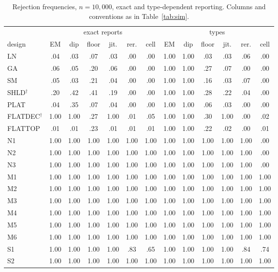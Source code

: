 \begin{table}[h]
\centering\footnotesize
\setlength{\tabcolsep}{4pt}
\caption{Rejection frequencies, $n=10{,}000$, exact and type-dependent reporting. Columns and conventions as in Table~\ref{tab:sim}.}\label{tab:S-sim10b}
\begin{tabular}{l*{6}{c}@{\hspace{10pt}}*{6}{c}}
\toprule
 & \multicolumn{6}{c}{exact reports} & \multicolumn{6}{c}{types}\\
\cmidrule(lr){2-7}\cmidrule(lr){8-13}
design & EM & dip & floor & jit. & rer. & cell & EM & dip & floor & jit. & rer. & cell\\
\midrule
LN & .04 & .03 & .07 & .03 & .00 & .00 & 1.00 & 1.00 & .03 & .03 & .06 & .00 \\
GA & .06 & .05 & .20 & .06 & .00 & .00 & 1.00 & 1.00 & .27 & .07 & .00 & .00 \\
SM & .05 & .03 & .21 & .04 & .00 & .00 & 1.00 & 1.00 & .16 & .03 & .07 & .00 \\
SHLD$^\dagger$ & .20 & .42 & .41 & .19 & .00 & .00 & 1.00 & 1.00 & .28 & .22 & .04 & .00 \\
PLAT & .04 & .35 & .07 & .04 & .00 & .00 & 1.00 & 1.00 & .06 & .03 & .00 & .00 \\
FLATDEC$^\dagger$ & 1.00 & 1.00 & .27 & 1.00 & .01 & .05 & 1.00 & 1.00 & .30 & 1.00 & .00 & .02 \\
FLATTOP & .01 & .01 & .23 & .01 & .01 & .01 & 1.00 & 1.00 & .22 & .02 & .00 & .01 \\
\midrule
N1 & 1.00 & 1.00 & 1.00 & 1.00 & 1.00 & 1.00 & 1.00 & 1.00 & 1.00 & 1.00 & 1.00 & .00 \\
N2 & 1.00 & 1.00 & 1.00 & 1.00 & 1.00 & 1.00 & 1.00 & 1.00 & 1.00 & 1.00 & 1.00 & .00 \\
N3 & 1.00 & 1.00 & 1.00 & 1.00 & 1.00 & 1.00 & 1.00 & 1.00 & 1.00 & 1.00 & 1.00 & .00 \\
M1 & 1.00 & 1.00 & 1.00 & 1.00 & 1.00 & 1.00 & 1.00 & 1.00 & 1.00 & 1.00 & 1.00 & 1.00 \\
M2 & 1.00 & 1.00 & 1.00 & 1.00 & 1.00 & 1.00 & 1.00 & 1.00 & 1.00 & 1.00 & 1.00 & 1.00 \\
M3 & 1.00 & 1.00 & 1.00 & 1.00 & 1.00 & 1.00 & 1.00 & 1.00 & 1.00 & 1.00 & 1.00 & 1.00 \\
M4 & 1.00 & 1.00 & 1.00 & 1.00 & 1.00 & 1.00 & 1.00 & 1.00 & 1.00 & 1.00 & 1.00 & 1.00 \\
M5 & 1.00 & 1.00 & 1.00 & 1.00 & 1.00 & 1.00 & 1.00 & 1.00 & 1.00 & 1.00 & 1.00 & 1.00 \\
M6 & 1.00 & 1.00 & 1.00 & 1.00 & 1.00 & 1.00 & 1.00 & 1.00 & 1.00 & 1.00 & 1.00 & 1.00 \\
S1 & 1.00 & 1.00 & 1.00 & 1.00 & .83 & .65 & 1.00 & 1.00 & 1.00 & 1.00 & .84 & .74 \\
S2 & 1.00 & 1.00 & 1.00 & 1.00 & 1.00 & 1.00 & 1.00 & 1.00 & 1.00 & 1.00 & 1.00 & 1.00 \\
\bottomrule
\end{tabular}
\end{table}

